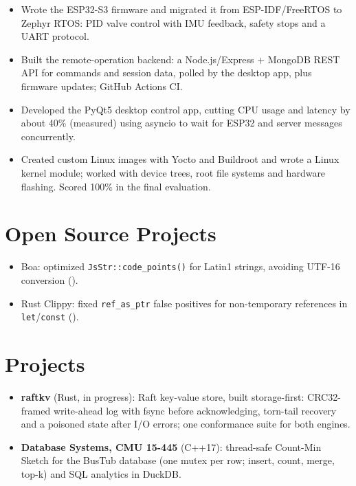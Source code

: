 \documentclass[10pt]{article}
\begin{document}
\begin{itemize}
  \item Wrote the ESP32-S3 firmware and migrated it from ESP-IDF/FreeRTOS to Zephyr RTOS: PID valve control with IMU feedback, safety stops and a UART protocol.
  \item Built the remote-operation backend: a Node.js/Express + MongoDB REST API for commands and session data, polled by the desktop app, plus firmware updates; GitHub Actions CI.
  \item Developed the PyQt5 desktop control app, cutting CPU usage and latency by about 40\% (measured) using asyncio to wait for ESP32 and server messages concurrently.
\end{itemize}
\begin{itemize}
  \item Created custom Linux images with Yocto and Buildroot and wrote a Linux kernel module; worked with device trees, root file systems and hardware flashing. Scored 100\% in the final evaluation.
\end{itemize}

\section*{Open Source Projects}
\begin{itemize}
  \item Boa: optimized \texttt{JsStr::code\_points()} for Latin1 strings, avoiding UTF-16 conversion ().
  \item Rust Clippy: fixed \texttt{ref\_as\_ptr} false positives for non-temporary references in \texttt{let}/\texttt{const} ().
\end{itemize}

\section*{Projects}
\begin{itemize}
  \item \textbf{raftkv} (Rust, in progress): Raft key-value store, built storage-first: CRC32-framed write-ahead log with fsync before acknowledging, torn-tail recovery and a poisoned state after I/O errors; one conformance suite for both engines. 
  \item \textbf{Database Systems, CMU 15-445} (C++17): thread-safe Count-Min Sketch for the BusTub database (one mutex per row; insert, count, merge, top-k) and SQL analytics in DuckDB. 
\end{itemize}
\end{document}
